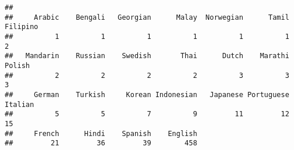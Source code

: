 \documentclass[
]{article}
\newenvironment{Shaded}{\begin{snugshade}}{\end{snugshade}}
\newcommand{\FunctionTok}[1]{\textcolor[rgb]{0.13,0.29,0.53}{\textbf{#1}}}
\newcommand{\NormalTok}[1]{#1}
\newcommand{\SpecialCharTok}[1]{\textcolor[rgb]{0.81,0.36,0.00}{\textbf{#1}}}
\begin{document}
\begin{Shaded}
\end{Shaded}

\begin{verbatim}
## 
##     Arabic    Bengali   Georgian      Malay  Norwegian      Tamil   Filipino 
##          1          1          1          1          1          1          2 
##   Mandarin    Russian    Swedish       Thai      Dutch    Marathi     Polish 
##          2          2          2          2          3          3          3 
##     German    Turkish     Korean Indonesian   Japanese Portuguese    Italian 
##          5          5          7          9         11         12         15 
##     French      Hindi    Spanish    English 
##         21         36         39        458
\end{verbatim}
\end{document}
